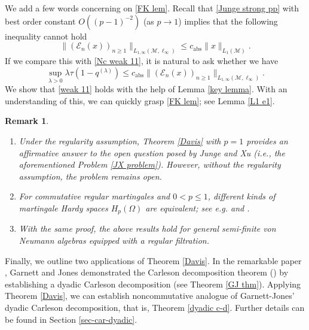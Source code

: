 \documentclass[11]{amsart}
\numberwithin{equation}{section}
\newtheorem{remark}[theorem]{Remark}
\begin{document}
 We add a few words concerning on \eqref{FK lem}. Recall that \eqref{Junge strong pp} with best order constant $O((p-1)^{-2})$ (as $p\to 1$) implies that the following inequality cannot hold
\begin{equation*}
	\|(\mathcal{E}_n(x))_{n\geq1}\|_{L_{1,\infty}(\mathcal{M},\ell_{\infty})}\leq c_{\mathrm{abs}}\|x\|_{L_1(\mathcal{M})}.
\end{equation*}
If we compare this with \eqref{Nc weak 11}, it is  natural to ask whether we have
\begin{equation}\label{weak 11}
	\sup_{\lambda>0}\lambda\tau(1-q^{(\lambda)}) \leq  c_{\mathrm{abs}}	\|(\mathcal{E}_n(x))_{n\geq1}\|_{L_{1,\infty}(\mathcal{M},\ell_{\infty})}.
\end{equation}
 We show that \eqref{weak 11} holds with the help of Lemma \ref{key lemma}. With an understanding of this,  we can quickly grasp \eqref{FK lem}; 	see Lemma \ref{L1 e1}. 

\begin{remark}\label{rem 1} 
	\begin{enumerate}[{\rm (i)}]
		\item Under the regularity assumption, Theorem \ref{Davis} with $p=1$ provides an affirmative answer to the open question posed by Junge and Xu (i.e., the aforementioned Problem \ref{JX problem}). However, without the regularity assumption, the problem remains open.
		\item For commutative regular martingales and $0<p\leq 1$, different kinds of martingale Hardy spaces $H_p(\Omega)$ are equivalent; see e.g. \cite{BG1970} and \cite[Corollary 2.23]{Weisz1994}.
		\item With the same proof, the above results hold for general semi-finite von Neumann algebras equipped with a regular filtration.
	\end{enumerate}
\end{remark}







Finally, we outline two applications of Theorem \ref{Davis}.  In the remarkable paper \cite{GJ1982}, Garnett and Jones demonstrated the Carleson decomposition theorem (\cite{Ca1976}) by establishing a dyadic Carleson decomposition (see Theorem \ref{GJ thm}). Applying Theorem \ref{Davis}, we can establish noncommutative analogue of Garnett-Jones' dyadic Carleson decomposition, that is, Theorem \ref{dyadic c-d}. Further details can be found in  Section \ref{sec-car-dyadic}.
\end{document}

